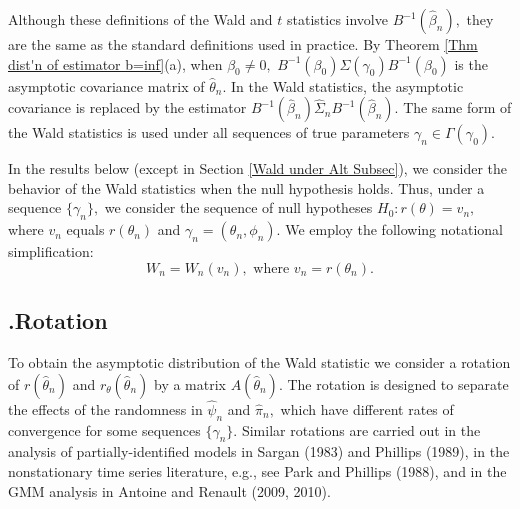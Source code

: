 \documentclass[12pt,titlepage,final,oneside,letterpaper]{article}
\begin{document}
\noindent Although these definitions of the Wald and $t$ statistics involve $%
B^{-1}(\widehat{\beta }_{n}),$ they are the same as the standard definitions
used in practice. By Theorem \ref{Thm dist'n of estimator b=inf}(a), when $%
\beta _{0}\neq 0,$ $B^{-1}(\beta _{0})\Sigma (\gamma _{0})B^{-1}(\beta _{0})$
is the asymptotic covariance matrix of $\widehat{\theta }_{n}.$ In the Wald
statistics, the asymptotic covariance is replaced by the estimator $B^{-1}(%
\widehat{\beta }_{n})\widehat{\Sigma }_{n}B^{-1}(\widehat{\beta }_{n}).$ The
same form of the Wald statistics is used under all sequences of true
parameters $\gamma _{n}\in \Gamma (\gamma _{0}).$

In the results below (except in Section \ref{Wald under Alt Subsec}), we
consider the behavior of the Wald statistics when the null hypothesis holds.
Thus, under a sequence $\{\gamma _{n}\},$ we consider the sequence of null
hypotheses $H_{0}:r(\theta )=v_{n},$ where $v_{n}$ equals $r(\theta _{n})$
and $\gamma _{n}=(\theta _{n},\phi _{n}).$ We employ the following
notational simplification:%
\begin{equation}
W_{n}=W_{n}(v_{n}),\text{ where }v_{n}=r(\theta _{n}).
\label{Null Defn of Wald and t Stats}
\end{equation}

\subsection{\hspace{-0.23in}\textbf{.}\hspace{0.18in}Rotation}

\hspace{0.25in}To obtain the asymptotic distribution of the Wald statistic
we consider a rotation of $r(\widehat{\theta }_{n})$ and $r_{\theta }(%
\widehat{\theta }_{n})$ by a matrix $A(\widehat{\theta }_{n}).$ The rotation
is designed to separate the effects of the randomness in $\widehat{\psi }%
_{n} $ and $\widehat{\pi }_{n},$ which have different rates of convergence
for some sequences $\{\gamma _{n}\}.$ Similar rotations are carried out in
the analysis of partially-identified models in Sargan (1983) and Phillips
(1989), in the nonstationary time series literature, e.g., see Park and
Phillips (1988), and in the GMM analysis in Antoine and Renault (2009, 2010).
\end{document}
